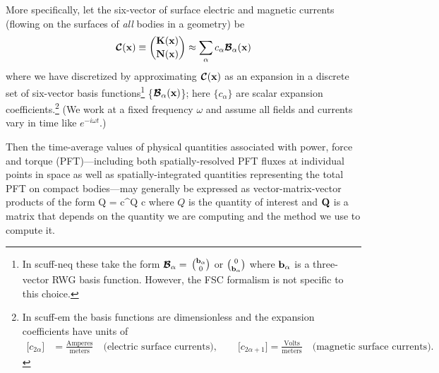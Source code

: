 \documentclass[letterpaper]{article}
\begin{document}
More specifically, let the six-vector of surface electric
and magnetic currents (flowing on the surfaces of \textit{all}
bodies in a geometry) be
$$ \boldsymbol{\mathcal{C}}(\mathbf{x})\equiv{\mathbf{K}(\mathbf{x}) \choose \mathbf{N}(\mathbf{x})}
   \approx \sum_{\alpha} c_\alpha \boldsymbol{\mathcal{B}}_\alpha(\mathbf{x})
$$
where we have discretized by approximating $\boldsymbol{\mathcal{C}}(\mathbf{x})$ as an
expansion in a discrete set of six-vector basis
functions\footnote{In {\sc scuff-neq} these take the form
$\boldsymbol{\mathcal{B}}_\alpha=$ 
$\mathbf{b}_\alpha \choose 0$ 
or 
$0 \choose \mathbf{b}_\alpha$
where $\mathbf{b}_\alpha$ is a three-vector RWG basis function.
However, the FSC formalism is not specific to this choice.}
\{$\boldsymbol{\mathcal{B}}_\alpha(\mathbf{x})$\}; here $\{c_\alpha\}$ are 
scalar expansion coefficients.\footnote{In {\sc scuff-em}
the basis functions are dimensionless and the expansion
coefficients have units of 
\begin{align*}
 \big[c_{2\alpha}\big]&=\frac{\text{Amperes}}{\text{meters}}
 \quad \text{(electric surface currents)}, \qquad
 \big[c_{2\alpha+1}\big]=\frac{\text{Volts}}{\text{meters}}
 \quad \text{(magnetic surface currents).}
\end{align*}}
(We work at a fixed frequency $\omega$ and assume all fields
and currents vary in time like $e^{-i\omega t}$.)

Then the time-average values of physical quantities associated 
with power, force and torque (PFT)---including both spatially-resolved
PFT fluxes at individual points in space as well as spatially-integrated
quantities representing the total PFT on compact bodies---may 
generally be expressed as vector-matrix-vector products of the 
form
 {Q = \vb c^\dagger \vb Q \vb c}
where $Q$ is the quantity of interest and $\mathbf{Q}$ is a matrix
that depends on the quantity we are computing and the method we
use to compute it.
\end{document}

